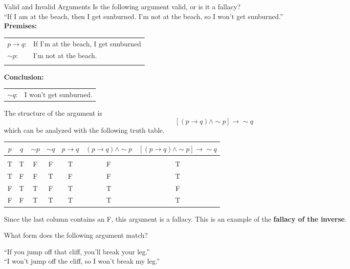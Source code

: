 \begin{example}[https://www.youtube.com/watch?v=QS_cuap6hy0]{Valid and Invalid Arguments}
Is the following argument valid, or is it a fallacy?\\

``If I am at the beach, then I get sunburned.  I'm not at the beach, so I won't get sunburned.''\\

\textbf{Premises:}\\
\begin{tabular}{l l}
$p \to q$: & If I'm at the beach, I get sunburned\\
$\sim p$: & I'm not at the beach.\\
& \\
\end{tabular}

\textbf{Conclusion:}\\
\begin{tabular}{l l}
$\sim q$: & I won't get sunburned.
\end{tabular}

The structure of the argument is \[[(p \to q) \wedge \sim p] \to \sim q\]
which can be analyzed with the following truth table.
\begin{center}
\begin{tabular}{|c c c c c c c|}
\hline
$p$ & $q$ & $\sim p$ & $\sim q$ & $p \to q$ & $(p \to q) \wedge \sim p$ & $[(p \to q) \wedge \sim p] \to \sim q$\\
\hline
& & & & & & \\
T & T & F & F & T & F & T\\
T & F & F & T & F & F & T\\
F & T & T & F & T & T & F\\
F & F & T & T & T & T & T\\
\hline
\end{tabular}
\end{center}

Since the last column contains an F, this argument is a fallacy.  This is an example of the \textbf{fallacy of the inverse}.
\end{example}

\begin{try}
What form does the following argument match?

``If you jump off that cliff, you'll break your leg.''\\  ``I won't jump off the cliff, so I won't break my leg.''
\end{try}

